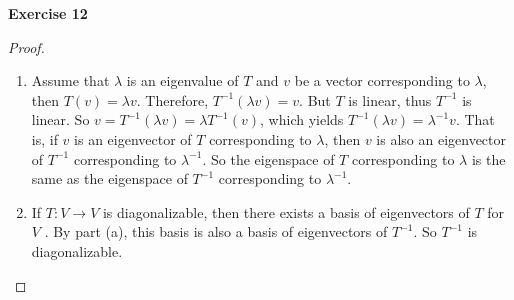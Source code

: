 \documentclass[12pt, a4paper]{article}
\theoremstyle{plain}
\newenvironment{exercise}[2][Exercise]
    { \begin{mdframed}[backgroundcolor=gray!20] \textbf{#1 #2} \\}
    {  \end{mdframed}}
\begin{document}
\begin{exercise}{12}

\end{exercise}
	\begin{proof}
	\hfill
	\begin{enumerate}[label=(\alph*)]
	\item Assume that $\lambda$ is an eigenvalue of $T$ and $v$ be a vector corresponding to $\lambda$, then $T(v)=\lambda v$. Therefore, $T^{-1}(\lambda v)=v$. But $T$ is linear, thus $T^{-1}$ is linear. So $v=T^{-1}(\lambda v)=\lambda T^{-1}(v)$, which yields $T^{-1}(\lambda v)=\lambda^{-1} v$. That is, if $v$ is an eigenvector of $T$ corresponding to $\lambda$, then $v$ is also an eigenvector of $T^{-1}$ corresponding to $\lambda^{-1}$. So the eigenspace of $T$ corresponding to $\lambda$ is the same as the eigenspace of $T^{-1}$ corresponding to $\lambda^{-1}$.
	\item If $T:V\rightarrow V$ is diagonalizable, then there exists a basis of eigenvectors of $T$ for $V$ . By part (a), this basis is also a basis of eigenvectors of $T^{-1}$. So $T^{-1}$ is diagonalizable.
	\end{enumerate}
	\end{proof}
	
\pagebreak
\end{document}
